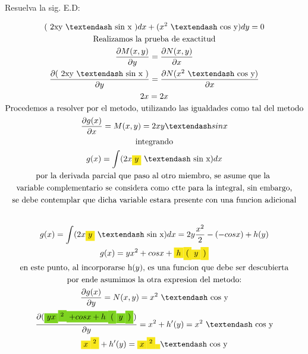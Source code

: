 \documentclass{article}
\begin{document}
Resuelva la sig. E.D:


\begin{gather*}
(\text{ 2xy – sin x }) dx + ( x^{2}\text{ – cos y}) dy = 0 \\
\text{Realizamos la prueba de exactitud} \\
\frac{\partial M(x,y)}{\partial y} = \frac{\partial N(x,y)}{\partial x}  \\
\frac{\partial (\text{ 2xy – sin x })}{\partial y} = \frac{\partial N( x^{2}\text{ – cos y})}{\partial x}  \\
2x=2x \\
\text{Procedemos a resolver por el metodo, utilizando las igualdades como tal del metodo} \\
\frac{\partial g(x)}{\partial x} =M(x,y) =2xy – sin x \\
\text{integrando} \\
g(x) = \int (2x\text{\colorbox[RGB]{248,231,28}{$y$}}\text{ – sin x})dx  \\
\text{por la derivada parcial que paso al otro miembro, se asume que la } \\
\text{variable complementario se considera como ctte para la integral, sin embargo,} \\
\text{se debe contemplar que dicha variable estara presente con una funcion adicional} \\
\vspace{0.5em} \\
g(x) = \int (2x\text{\colorbox[RGB]{248,231,28}{$y$}}\text{ – sin x})dx = 2y\frac{x^{2}}{2} - (-cosx)+h(y) \\
g(x) = yx^{2}+cosx+\text{\colorbox[RGB]{248,231,28}{$h$}}\text{\colorbox[RGB]{248,231,28}{$($}}\text{\colorbox[RGB]{248,231,28}{$y$}}\text{\colorbox[RGB]{248,231,28}{$)$}} \\
\text{en este punto, al incorporarse h}(y)\text{, es una funcion que debe ser descubierta} \\
\text{por ende asumimos la otra expresion del metodo:} \\
\frac{\partial g(x)}{\partial y} =N(x,y) =x^{2}\text{ – cos y} \\
\frac{\partial ( \text{\colorbox[RGB]{126,211,33}{$yx$}}\text{\colorbox[RGB]{126,211,33}{$^{2}$}}\text{\colorbox[RGB]{126,211,33}{$+cosx+h$}}\text{\colorbox[RGB]{126,211,33}{$($}}\text{\colorbox[RGB]{126,211,33}{$y$}}\text{\colorbox[RGB]{126,211,33}{$)$}})}{\partial y} =x^{2}+h'(y) =x^{2}\text{ – cos y} \\
\text{\colorbox[RGB]{248,231,28}{$x$}}\text{\colorbox[RGB]{248,231,28}{$^{2}$}}+h'(y) =\text{\colorbox[RGB]{248,231,28}{$x$}}\text{\colorbox[RGB]{248,231,28}{$^{2}$}}\text{\colorbox[RGB]{248,231,28}{$ $}}\text{– cos y} \\

\end{gather*}
\end{document}
